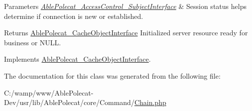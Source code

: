 \begin{DoxyParams}{Parameters}
{\em \hyperlink{interface_able_polecat___access_control___subject_interface}{Able\+Polecat\+\_\+\+Access\+Control\+\_\+\+Subject\+Interface}} & Session status helps determine if connection is new or established.\\
\hline
\end{DoxyParams}
\begin{DoxyReturn}{Returns}
\hyperlink{interface_able_polecat___cache_object_interface}{Able\+Polecat\+\_\+\+Cache\+Object\+Interface} Initialized server resource ready for business or N\+U\+L\+L. 
\end{DoxyReturn}


Implements \hyperlink{interface_able_polecat___cache_object_interface_a3f2135f6ad45f51d075657f6d20db2cd}{Able\+Polecat\+\_\+\+Cache\+Object\+Interface}.



The documentation for this class was generated from the following file\+:\begin{DoxyCompactItemize}
\item 
C\+:/wamp/www/\+Able\+Polecat-\/\+Dev/usr/lib/\+Able\+Polecat/core/\+Command/\hyperlink{_chain_8php}{Chain.\+php}\end{DoxyCompactItemize}
